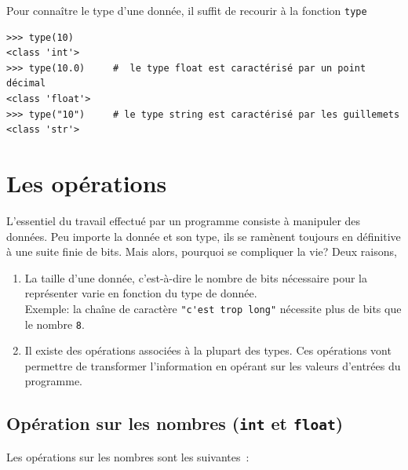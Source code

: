 \documentclass[11pt, a4paper]{book}
\begin{document}
\begin{apprendre}
	Pour connaître le type d’une donnée, il suffit de recourir à la fonction \lstinline{type}
	\begin{lstlisting}[numbers=none]
>>> type(10)
<class 'int'>
>>> type(10.0)     #  le type float est caractérisé par un point décimal
<class 'float'>
>>> type("10")     # le type string est caractérisé par les guillemets
<class 'str'>
	\end{lstlisting}
\end{apprendre}


\section{Les opérations}
L’essentiel du travail effectué par un programme consiste à manipuler des données. Peu importe la donnée et son type, ils se ramènent toujours en définitive à une suite finie de bits. Mais alors, pourquoi se compliquer la vie? Deux raisons,
\begin{enumerate}
	\item La taille d'une donnée, c'est-à-dire le nombre de bits nécessaire pour la représenter varie en fonction du type de donnée.\\
	Exemple: la chaîne de caractère \lstinline{"c'est trop long"} nécessite plus de bits que le nombre  \lstinline{8}.
	\item Il existe des opérations associées à la plupart des types. Ces opérations vont permettre de transformer l'information en opérant sur les valeurs d'entrées du programme.
\end{enumerate}


\subsection{Opération sur les nombres (\lstinline{int} et \lstinline{float})}
Les opérations sur les nombres sont les suivantes :
\end{document}
